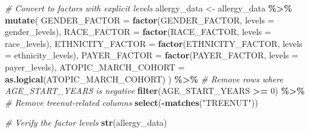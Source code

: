 \documentclass[
]{article}
\newenvironment{Shaded}{\begin{snugshade}}{\end{snugshade}}
\newcommand{\AttributeTok}[1]{\textcolor[rgb]{0.13,0.29,0.53}{#1}}
\newcommand{\CommentTok}[1]{\textcolor[rgb]{0.56,0.35,0.01}{\textit{#1}}}
\newcommand{\DecValTok}[1]{\textcolor[rgb]{0.00,0.00,0.81}{#1}}
\newcommand{\FunctionTok}[1]{\textcolor[rgb]{0.13,0.29,0.53}{\textbf{#1}}}
\newcommand{\NormalTok}[1]{#1}
\newcommand{\OtherTok}[1]{\textcolor[rgb]{0.56,0.35,0.01}{#1}}
\newcommand{\SpecialCharTok}[1]{\textcolor[rgb]{0.81,0.36,0.00}{\textbf{#1}}}
\newcommand{\StringTok}[1]{\textcolor[rgb]{0.31,0.60,0.02}{#1}}
\begin{document}
\begin{Shaded}
\begin{Highlighting}[]
\CommentTok{\# Convert to factors with explicit levels}
\NormalTok{allergy\_data }\OtherTok{\textless{}{-}}\NormalTok{ allergy\_data }\SpecialCharTok{\%\textgreater{}\%}
  \FunctionTok{mutate}\NormalTok{(}
    \AttributeTok{GENDER\_FACTOR =} \FunctionTok{factor}\NormalTok{(GENDER\_FACTOR, }\AttributeTok{levels =}\NormalTok{ gender\_levels),}
    \AttributeTok{RACE\_FACTOR =} \FunctionTok{factor}\NormalTok{(RACE\_FACTOR, }\AttributeTok{levels =}\NormalTok{ race\_levels),}
    \AttributeTok{ETHNICITY\_FACTOR =} \FunctionTok{factor}\NormalTok{(ETHNICITY\_FACTOR, }\AttributeTok{levels =}\NormalTok{ ethnicity\_levels),}
    \AttributeTok{PAYER\_FACTOR =} \FunctionTok{factor}\NormalTok{(PAYER\_FACTOR, }\AttributeTok{levels =}\NormalTok{ payer\_levels),}
    \AttributeTok{ATOPIC\_MARCH\_COHORT =} \FunctionTok{as.logical}\NormalTok{(ATOPIC\_MARCH\_COHORT)}
\NormalTok{  ) }\SpecialCharTok{\%\textgreater{}\%}
  \CommentTok{\# Remove rows where AGE\_START\_YEARS is negative}
  \FunctionTok{filter}\NormalTok{(AGE\_START\_YEARS }\SpecialCharTok{\textgreater{}=} \DecValTok{0}\NormalTok{) }\SpecialCharTok{\%\textgreater{}\%}
  \CommentTok{\# Remove treenut{-}related columns}
  \FunctionTok{select}\NormalTok{(}\SpecialCharTok{{-}}\FunctionTok{matches}\NormalTok{(}\StringTok{"TREENUT"}\NormalTok{))}

\CommentTok{\# Verify the factor levels}
\FunctionTok{str}\NormalTok{(allergy\_data)}
\end{Highlighting}
\end{Shaded}
\end{document}
